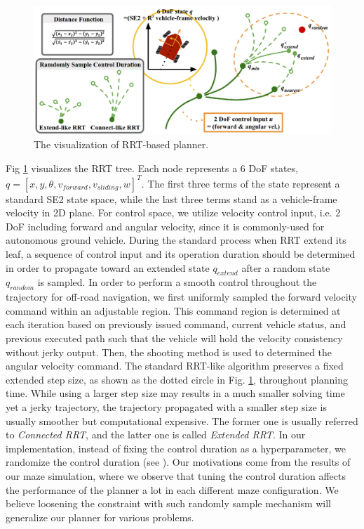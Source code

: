 \documentclass[../thesis.tex]{subfiles}
\begin{document}
\begin{figure}[t]
	\begin{center}
		\centerline{\includegraphics[width=0.8\columnwidth]{./RRTPlanner/fig/rrt.png}}
		\caption{The visualization of RRT-based planner.}
		\label{fig:rrt}
	\end{center}
\end{figure} 

Fig \ref{fig:rrt} visualizes the RRT tree. Each node represents a $6$ DoF states, $q=[x,y, \theta ,v_{forward}, v_{sliding}, w]^T$. The first three terms of the state represent a standard SE2 state space, while the last three terms stand as a vehicle-frame velocity in 2D plane. For control space, we utilize velocity control input, i.e. 2 DoF including forward and angular velocity, since it is commonly-used for autonomous ground vehicle. 
During the standard process when RRT extend its leaf, a sequence of control input and its operation duration should be determined in order to propagate toward an extended state $q_{extend}$ after a random state $q_{random}$ is sampled. In order to perform a smooth control throughout the trajectory for off-road navigation, we first uniformly sampled the forward velocity command within an adjustable region. This command region is determined at each iteration based on previously issued command, current vehicle status, and previous executed path such that the vehicle will hold the velocity consistency without jerky output. Then, the shooting method is used to determined the angular velocity command.
The standard RRT-like algorithm preserves a fixed extended step size, as shown as the dotted circle in Fig. \ref{fig:rrt}, throughout planning time. While using a larger step size may results in a much smaller solving time yet a jerky trajectory, the trajectory propagated with a smaller step size is usually smoother but computational expensive. The former one is usually referred to \textit{Connected RRT}, and the latter one is called \textit{Extended RRT}. In our implementation, instead of fixing the control duration as a hyperparameter, we randomize the control duration (see ). Our motivations come from the results of our maze simulation, where we observe that tuning the control duration affects the performance of the planner a lot in each different maze configuration. We believe loosening the constraint with such randomly sample mechanism will generalize our planner for various problems. 
\end{document}
